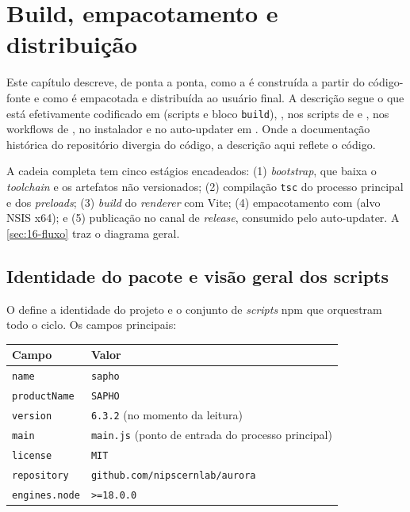 \chapter{Build, empacotamento e distribuição}
\label{cap:16-build-distribuicao}

Este capítulo descreve, de ponta a ponta, como a  é construída a
partir do código-fonte e como é empacotada e distribuída ao usuário final. A
descrição segue o que está efetivamente codificado em 
(scripts e bloco \texttt{build}), , nos scripts de
 e , nos workflows de
, no instalador  e no
auto-updater em . Onde a documentação histórica do
repositório divergia do código, a descrição aqui reflete o código.

A cadeia completa tem cinco estágios encadeados: (1) \emph{bootstrap}, que baixa
o \emph{toolchain} e os artefatos não versionados; (2) compilação \texttt{tsc}
do processo principal e dos \emph{preloads}; (3) \emph{build} do \emph{renderer}
com Vite; (4) empacotamento com  (alvo NSIS x64); e (5)
publicação no canal de \emph{release}, consumido pelo auto-updater. A
\autoref{sec:16-fluxo} traz o diagrama geral.

\section{Identidade do pacote e visão geral dos scripts}
\label{sec:16-identidade}

O  define a identidade do projeto e o conjunto de
\emph{scripts} npm que orquestram todo o ciclo. Os campos principais:

\begin{tabularx}{\linewidth}{l Y}
\toprule
\textbf{Campo} & \textbf{Valor} \\
\midrule
\texttt{name}        & \texttt{sapho} \\
\texttt{productName} & \texttt{SAPHO} \\
\texttt{version}     & \texttt{6.3.2} (no momento da leitura) \\
\texttt{main}        & \texttt{main.js} (ponto de entrada do processo principal) \\
\texttt{license}     & \texttt{MIT} \\
\texttt{repository}  & \lstinline|github.com/nipscernlab/aurora| \\
\texttt{engines.node}& \lstinline|>=18.0.0| \\
\bottomrule
\end{tabularx}

